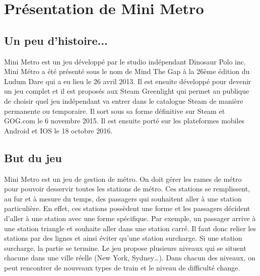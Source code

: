 \documentclass[report, backcover, french, nodocumentinfo]{upmethodology-document}
\begin{document}
	\upmdocumentsummary{}
	\upmdocumentauthors{}
	\upmdocumentinformedpeople{}
	\upmpublicationpage{}

	\tableofcontents{}
	\listoffigures{}

	\newpage{}
	\chapter{Présentation de Mini Metro}
		\section{Un peu d'histoire...}
			\p{}
				Mini Metro est un jeu développé par le studio indépendant Dinosaur Polo inc. Mini Métro a été présenté sous le nom de Mind The Gap à la 26ème édition du Ludum Dare qui a eu lieu le 26 avril 2013. Il est ensuite développé pour devenir un jeu complet et il est proposés aux Steam Greenlight qui permet au publique de choisir quel jeu indépendant va entrer dans le catalogue Steam de manière permanente ou temporaire. Il sort sous sa forme définitive sur Steam et GOG.com le 6 novembre 2015. Il est ensuite porté sur les plateformes mobiles Android et IOS le 18 octobre 2016.
		\section{But du jeu}
			\p{}
				Mini Metro est un jeu de gestion de métro. On doit gérer les rames de métro pour pouvoir desservir toutes les stations de métro. Ces stations se remplissent, au fur et à mesure du temps, des passagers qui souhaitent aller à une station particulière. En effet, ces stations possèdent une forme et les passagers décident d'aller à une station avec une forme spécifique. Par exemple, un passager arrive à une station triangle et souhaite aller dans une station carré. Il faut donc relier les stations par des lignes et ainsi éviter qu’une station surcharge. Si une station surcharge, la partie se termine.
			\p{}
				Le jeu propose plusieurs niveaux qui se situent chacune dans une ville réelle (New York, Sydney\ldots). Dans chacun des niveaux, on peut rencontrer de nouveaux types de train et le niveau de difficulté change.
\end{document}
